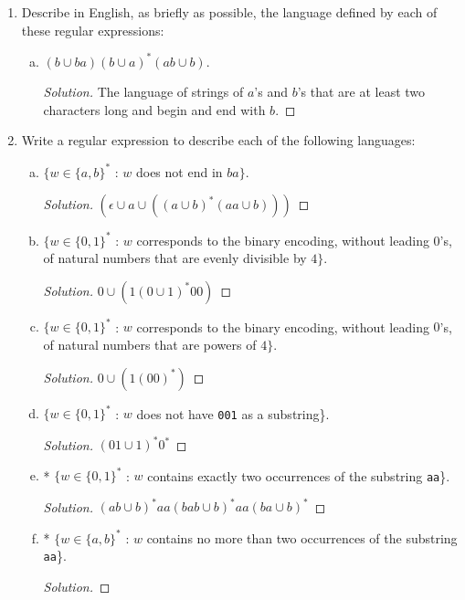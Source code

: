 \documentclass[10pt]{article}
\begin{document}
\begin{enumerate}[1)]

\item
Describe in English, as briefly as possible, the language defined by each of these regular expressions:
\begin{enumerate}[a)]
\item
$(b \cup ba) (b \cup a)^* (ab \cup b)$.
\begin{proof}[Solution]
The language of strings of $a$'s and $b$'s that are at least two characters long and begin and end with $b$.
\end{proof}

\end{enumerate}


\item
Write a regular expression to describe each of the following languages:
\begin{enumerate}[a)]
\addtocounter{enumii}{1}
\item
$\{w \in \{a, b\}^*$ : $w$ does not end in $ba\}$.
\begin{proof}[Solution]
$(\epsilon \cup a \cup ((a \cup b)^*(aa \cup b))) $
\end{proof}

\addtocounter{enumii}{1}
\item
$\{w \in \{0, 1\}^*$ : $w$ corresponds to the binary encoding, without leading $0$'s, of natural numbers that are evenly divisible by $4\}$.
\begin{proof}[Solution]
$0 \cup (1(0 \cup 1)^* 00)$
\end{proof}
\item
$\{w \in \{0, 1\}^*$ : $w$ corresponds to the binary encoding, without leading $0$'s, of natural numbers that are powers of $4\}$.
\begin{proof}[Solution]
$0 \cup (1(00)^*)$
\end{proof}
\addtocounter{enumii}{2}
\item
$\{w \in \{0, 1\}^*$ : $w$ does not have \texttt{001} as a substring\}.
\begin{proof}[Solution]
$(01 \cup 1)^*0^*$
\end{proof}
\addtocounter{enumii}{7}
\item
* $\{w \in \{0, 1\}^*$ : $w$ contains exactly two occurrences of the substring \texttt{aa}\}.
\begin{proof}[Solution]
$(ab \cup b)^*aa(bab \cup b)^*aa(ba \cup b)^*$
\end{proof}
\item
* $\{w \in \{a, b\}^*$ : $w$ contains no more than two occurrences of the substring \texttt{aa}\}.
\begin{proof}[Solution]
\end{proof}
\end{enumerate}


\end{enumerate}
\end{document}
